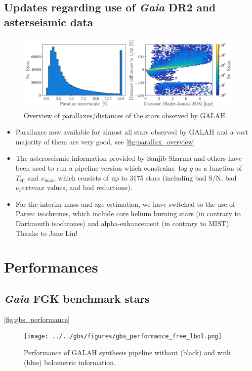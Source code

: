 \documentclass[a4paper,11pt,english]{article}
\begin{document}
\subsection{Updates regarding use of \textit{Gaia} DR2 and asterseismic data}

\begin{figure}[!ht]
\centering
\includegraphics[width=\textwidth]{../../input/figures/parallax_uncertainties.png}
\caption{Overview of parallaxes/distances of the stars observed by GALAH.}
\label{fig:parallax_overview}
\end{figure}

\begin{itemize}
\item Parallaxes now available for almost all stars observed by GALAH and a vast majority of them are very good, see \autoref{fig:parallax_overview}
\item The asteroseismic information provided by Sanjib Sharma and others have been used to run a pipeline version which constrains $\log g$ as a function of $T_\text{eff}$ and $\nu_\text{max}$, which consists of up to 3175 stars (including bad S/N, bad $\nu_text{max}$ values, and bad reductions).
\item For the interim mass and age estimation, we have switched to the use of Parsec isochrones, which include core helium burning stars (in contrary to Dartmouth isochrones) and alpha-enhancement (in contrary to MIST). Thanks to Jane Lin!
\end{itemize}

\section{Performances}

\subsection{\textit{Gaia} FGK benchmark stars}

\autoref{fig:gbs_performance}

\begin{figure}[!ht]
\centering
\texttt{[image: ../../gbs/figures/gbs\_performance\_free\_lbol.png]}
\caption{Performance of GALAH synthesis pipeline without (black) and with (blue) bolometric information.}
\label{fig:gbs_performance}
\end{figure}
\end{document}
